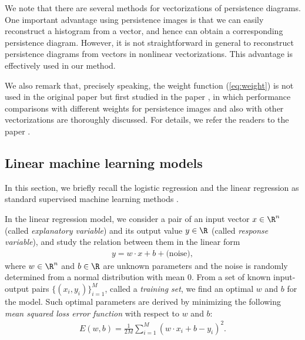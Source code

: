 \documentclass[smallextended]{svjour3}
\begin{document}
We note that there are several methods for vectorizations of persistence diagrams. One important advantage using persistence images is that we can easily reconstruct a histogram from a vector, and hence can obtain a corresponding persistence diagram. 
However, it is not straightforward in general to reconstruct persistence diagrams from vectors in nonlinear vectorizations.  This advantage is effectively used in our method. 

We also remark that, precisely speaking, the weight function (\ref{eq:weight}) is not used in the original paper \citep{persistence_image} but first studied in the paper \citep{kusano2}, in which  performance comparisons with different weights for persistence images and also with other vectorizations are thoroughly discussed. For details, we refer the readers to the paper \citep{kusano2}. 







\subsection{Linear machine learning models}\label{sec:linear_models}
In this section, we briefly recall the logistic regression and the linear regression as standard supervised machine learning methods \citep{prml}.

In the linear regression model,
we consider a pair of an input vector $x \in \R^n$ (called \emph{explanatory variable})
and its output value $y \in \R$ (called \emph{response variable}), and study the relation between them in the linear form
\begin{align*}
  y = w \cdot x + b + \textrm{(noise)},
\end{align*}
where $w \in \R^n$ and $b \in \R$ are unknown parameters and the
noise is randomly determined from a normal distribution with mean 0.
From a set of known input-output pairs $\{(x_i, y_i)\}_{i=1}^M$, called
a \emph{training set}, we find an optimal $w$ and $b$ for the model.
Such optimal parameters are derived by minimizing the following \emph{mean squared loss error function} with respect to $w$ and $b$:
\begin{align}
  E(w, b) = \frac{1}{2M} \sum_{i=1}^M (w\cdot x_i+b - y_i)^2 .\label{eq:error-linear-regression}
\end{align}
\end{document}
